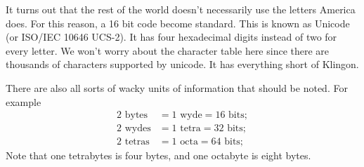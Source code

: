 It turns out that the rest of the world doesn't necessarily use
the letters America does. For this reason, a 16 bit code become
standard. This is known as Unicode (or ISO/IEC 10646 UCS-2). It
has four hexadecimal digits instead of two for every letter. We
won't worry about the character table here since there are
thousands of characters supported by unicode. It has everything
short of Klingon. 

There are also all sorts of wacky units of information that
should be noted. For example
\begin{align*}
\text{2 bytes} &= \text{1 wyde} = {16}\text{ bits};\\
\text{2 wydes} &= \text{1 tetra} = {32}\text{ bits};\\
\text{2 tetras} &= \text{1 octa} = {64}\text{ bits};
\end{align*}
Note that one tetrabytes is four bytes, and one octabyte is eight
bytes. 
